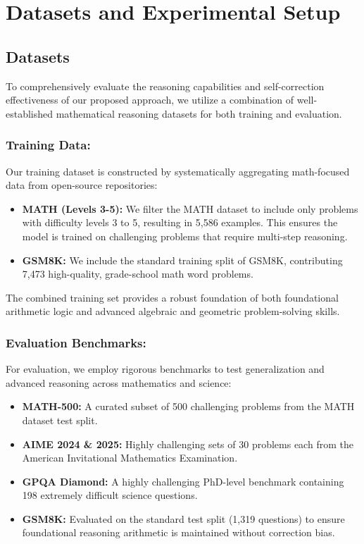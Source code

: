 \section{Datasets and Experimental Setup}

\subsection{Datasets}
To comprehensively evaluate the reasoning capabilities and self-correction effectiveness of our proposed approach, we utilize a combination of well-established mathematical reasoning datasets for both training and evaluation.

\subsubsection{Training Data:}
Our training dataset is constructed by systematically aggregating math-focused data from open-source repositories:
\begin{itemize}
    \item \textbf{MATH (Levels 3-5):} We filter the MATH dataset to include only problems with difficulty levels 3 to 5, resulting in 5,586 examples. This ensures the model is trained on challenging problems that require multi-step reasoning.
    \item \textbf{GSM8K:} We include the standard training split of GSM8K, contributing 7,473 high-quality, grade-school math word problems.
\end{itemize}
The combined training set provides a robust foundation of both foundational arithmetic logic and advanced algebraic and geometric problem-solving skills.

\subsubsection{Evaluation Benchmarks:}
For evaluation, we employ rigorous benchmarks to test generalization and advanced reasoning across mathematics and science:
\begin{itemize}
    \item \textbf{MATH-500:} A curated subset of 500 challenging problems from the MATH dataset test split.
    \item \textbf{AIME 2024 \& 2025:} Highly challenging sets of 30 problems each from the American Invitational Mathematics Examination.
    \item \textbf{GPQA Diamond:} A highly challenging PhD-level benchmark containing 198 extremely difficult science questions.
    \item \textbf{GSM8K:} Evaluated on the standard test split (1,319 questions) to ensure foundational reasoning arithmetic is maintained without correction bias.
\end{itemize}
\clearpage



